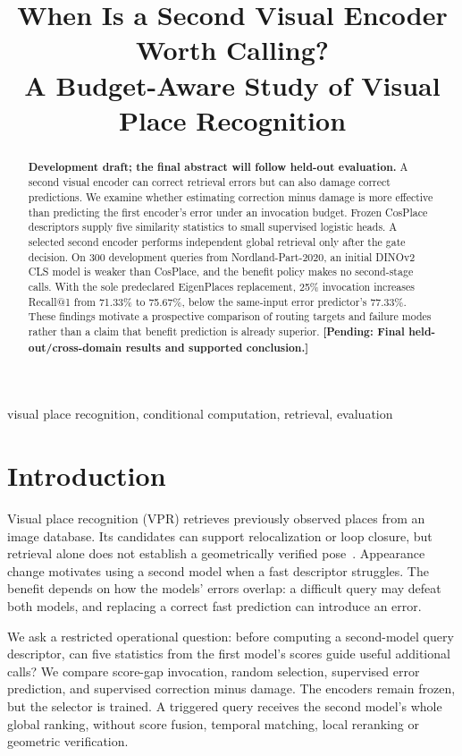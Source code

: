 \documentclass[conference]{IEEEtran}
\title{When Is a Second Visual Encoder Worth Calling?\\
A Budget-Aware Study of Visual Place Recognition}
\author{\IEEEauthorblockN{Mingyang Zhou}
\IEEEauthorblockA{University of Chinese Academy of Sciences\\
\textit{Additional authors and correspondence pending}}}
\newcommand{\pending}[1]{\textbf{[Pending: #1]}}
\begin{document}
\maketitle
\begin{abstract}
\textbf{Development draft; the final abstract will follow held-out evaluation.}
A second visual encoder can correct retrieval errors but can also damage
correct predictions. We examine whether estimating correction minus damage
is more effective than predicting the first encoder's error under an
invocation budget. Frozen CosPlace descriptors supply five similarity
statistics to small supervised logistic heads. A selected second encoder
performs independent global retrieval only after the gate decision.
On 300 development queries from Nordland-Part-2020, an initial DINOv2 CLS
model is weaker than CosPlace, and the benefit policy makes no second-stage
calls. With the sole predeclared EigenPlaces replacement, 25\% invocation
increases Recall@1 from 71.33\% to 75.67\%, below the same-input error
predictor's 77.33\%. These findings motivate a prospective comparison of
routing targets and failure modes rather than a claim that benefit
prediction is already superior.
\pending{Final held-out/cross-domain results and supported conclusion.}
\end{abstract}
\begin{IEEEkeywords}
visual place recognition, conditional computation, retrieval, evaluation
\end{IEEEkeywords}

\section{Introduction}
Visual place recognition (VPR) retrieves previously observed places from
an image database. Its candidates can support relocalization or loop
closure, but retrieval alone does not establish a geometrically verified
pose~\cite{tutorial}. Appearance change motivates using a second model
when a fast descriptor struggles. The benefit depends on how the models'
errors overlap: a difficult query may defeat both models, and replacing a
correct fast prediction can introduce an error.

We ask a restricted operational question: before computing a second-model
query descriptor, can five statistics from the first model's scores guide
useful additional calls? We compare score-gap invocation, random selection,
supervised error prediction, and supervised correction minus damage.
The encoders remain frozen, but the selector is trained. A triggered query
receives the second model's whole global ranking, without score fusion,
temporal matching, local reranking or geometric verification.
\end{document}
